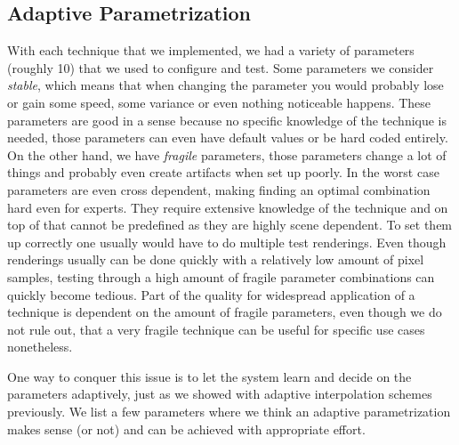 \subsection{Adaptive Parametrization}

With each technique that we implemented, we had a variety of parameters (roughly 10) that we used to configure and test. Some parameters we consider \textit{stable}, which means that when changing the parameter you would probably lose or gain some speed, some variance or even nothing noticeable happens. These parameters are good in a sense because no specific knowledge of the technique is needed, those parameters can even have default values or be hard coded entirely. On the other hand, we have \textit{fragile} parameters, those parameters change a lot of things and probably even create artifacts when set up poorly. In the worst case parameters are even cross dependent, making finding an optimal combination hard even for experts. They require extensive knowledge of the technique and on top of that cannot be predefined as they are highly scene dependent. To set them up correctly one usually would have to do multiple test renderings. Even though renderings usually can be done quickly with a relatively low amount of pixel samples, testing through a high amount of fragile parameter combinations can quickly become tedious. Part of the quality for widespread application of a technique is dependent on the amount of fragile parameters, even though we do not rule out, that a very fragile technique can be useful for specific use cases nonetheless.

One way to conquer this issue is to let the system learn and decide on the parameters adaptively, just as we showed with adaptive interpolation schemes previously. We list a few parameters where we think an adaptive parametrization makes sense (or not) and can be achieved with appropriate effort.

